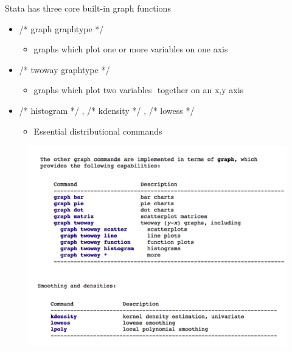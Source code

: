 \documentclass[aspectratio=169]{beamer}
\begin{document}
\begin{frame}[fragile]{Stata has three core built-in graph functions}
\begin{multicols}{2}	
	\begin{itemize}
		\item /* graph graphtype */
				\begin{itemize}
					\item graphs which plot one or more variables on one axis
				\end{itemize}
		\item /* twoway graphtype */
				\begin{itemize}
					\item graphs which plot two variables  together on an x,y axis
				\end{itemize}
		\item /* histogram */ , /* kdensity */ , /* lowess */
				\begin{itemize}
					\item Essential distributional commands 
				\end{itemize}
	\end{itemize}
	\begin{figure}
		\centering
		\includegraphics[width=\linewidth]{img/graphcommand}
	\end{figure}
\end{multicols}
\end{frame}
\end{document}
